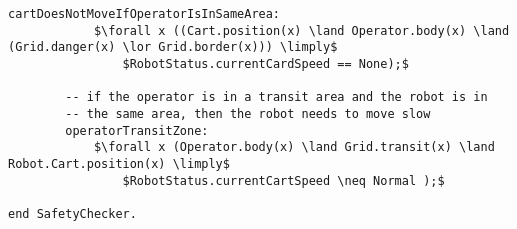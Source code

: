 \begin{lstlisting}[fontadjust, mathescape, frame=single]
        cartDoesNotMoveIfOperatorIsInSameArea:
            $\forall x ((Cart.position(x) \land Operator.body(x) \land (Grid.danger(x) \lor Grid.border(x))) \limply$
                $RobotStatus.currentCardSpeed == None);$

        -- if the operator is in a transit area and the robot is in
        -- the same area, then the robot needs to move slow
        operatorTransitZone:
            $\forall x (Operator.body(x) \land Grid.transit(x) \land Robot.Cart.position(x) \limply$
                $RobotStatus.currentCartSpeed \neq Normal );$

end SafetyChecker.                
\end{lstlisting}
